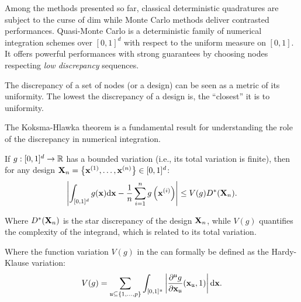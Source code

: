 Among the methods presented so far, classical deterministic quadratures are subject to the curse of dim while Monte Carlo methods deliver contrasted performances. 
Quasi-Monte Carlo is a deterministic family of numerical integration schemes over $[0, 1]^d$ with respect to the uniform measure on $[0, 1]$. 
It offers powerful performances with strong guarantees by choosing nodes respecting \textit{low discrepancy} sequences. 

The discrepancy of a set of nodes (or a design) can be seen as a metric of its uniformity. 
The lowest the discrepancy of a design is, the ``closest'' it is to uniformity. 

The Koksma-Hlawka theorem \citep*{morokoff_1995,leobacher_2014} is a fundamental result for understanding the role of the discrepancy in numerical integration. 
\begin{theorem}
    If $g:[0, 1]^d\rightarrow\mathbb{R}$ has a bounded variation (i.e., its total variation is finite), then for any design ${\bf X}_n = \left\{{\bf x}^{(1)}, \dots, {\bf x}^{(n)}\right\} \in [0, 1]^d$:
    \begin{equation}
        \left| \int_{[0, 1]^d} g({\bf x}) \mathrm{d}{\bf x} - \frac1n \sum_{i=1}^n g\left({\bf x}^{(i)}\right)\right| \leq  V(g) D^*({\bf X}_n).
        \label{eq:KH_inequality}
    \end{equation}

    Where $D^*({\bf X}_n)$ is the star discrepancy of the design ${\bf X}_n$, while $V(g)$ quantifies the complexity of the integrand, which is related to its total variation. 
\end{theorem}

Where the function variation $V(g)$ in the  can formally be defined as the Hardy-Klause variation: 
\begin{equation}
    V(g) = \sum_{\mathfrak{u}\subseteq\{1, \dots, p \}} \int_{[0, 1]^\mathfrak{u}} \left| \frac{\partial^{\mathfrak{u}}g}{\partial {\bf x}_{\mathfrak{u}}}({\bf x}_{\mathfrak{u}}, 1)\right| \mathrm{d}{\bf x}.
\end{equation}

